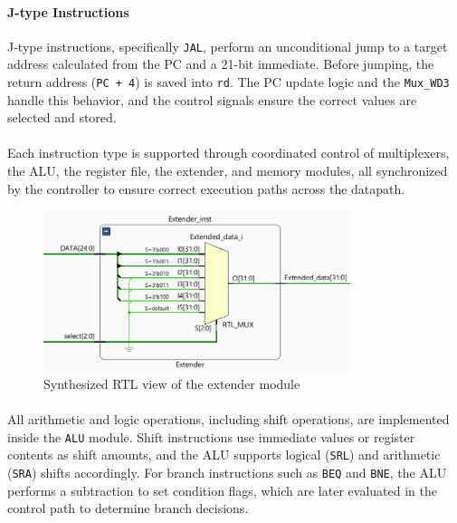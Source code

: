 \documentclass[12pt]{report}
\begin{document}
\paragraph{J-type Instructions}
J-type instructions, specifically \texttt{JAL}, perform an unconditional jump to a target address calculated from the PC and a 21-bit immediate. Before jumping, the return address (\texttt{PC + 4}) is saved into \texttt{rd}. The PC update logic and the \texttt{Mux\_WD3} handle this behavior, and the control signals ensure the correct values are selected and stored.

\paragraph{}
Each instruction type is supported through coordinated control of multiplexers, the ALU, the register file, the extender, and memory modules, all synchronized by the controller to ensure correct execution paths across the datapath.


\begin{figure}[h]
    \centering
    \includegraphics[width=0.8\textwidth]{figures/rtl_extender.png}
    \caption{Synthesized RTL view of the extender module}
    \label{fig:extender rtl}
\end{figure}

\paragraph{}
All arithmetic and logic operations, including shift operations, are implemented inside the \texttt{ALU} module. Shift instructions use immediate values or register contents as shift amounts, and the ALU supports logical (\texttt{SRL}) and arithmetic (\texttt{SRA}) shifts accordingly. For branch instructions such as \texttt{BEQ} and \texttt{BNE}, the ALU performs a subtraction to set condition flags, which are later evaluated in the control path to determine branch decisions.
\end{document}
